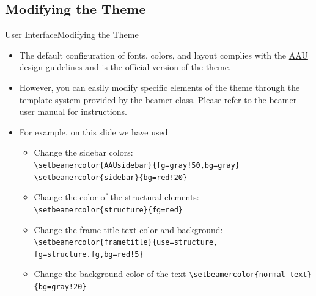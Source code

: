 \documentclass[10pt]{beamer}
\newcommand{\chref}[2]{%
  \href{#1}{{\usebeamercolor[bg]{AAUsidebar}#2}}%
}
\begin{document}
\subsection{Modifying the Theme}
{
\begin{frame}{User Interface}{Modifying the Theme}
  \begin{itemize}
    \item<1-> The default configuration of fonts, colors, and layout complies with the \chref{http://aau.designguides.dk}{AAU design guidelines} and is the \alert{official} version of the theme.
    \item<2-> However, you can easily modify specific elements of the theme through the template system provided by the beamer class. Please refer to the beamer user manual for instructions.
    \item<3-> For example, on this slide we have used
      \begin{itemize}
        \item Change the sidebar colors:\\
        {\tt \textbackslash setbeamercolor\{AAUsidebar\}\{fg=gray!50,bg=gray\}}
        {\tt \textbackslash setbeamercolor\{sidebar\}\{bg=red!20\}}
        \item Change the color of the structural elements:\\
        {\tt \textbackslash setbeamercolor\{structure\}\{fg=red\}}\\
        \item Change the frame title text color and background:
        {\tt \textbackslash setbeamercolor\{frametitle\}\{use=structure, fg=structure.fg,bg=red!5\}}
        \item Change the background color of the text
        {\tt \textbackslash setbeamercolor\{normal text\}\{bg=gray!20\}}
      \end{itemize}
  \end{itemize}
\end{frame}}
\end{document}

